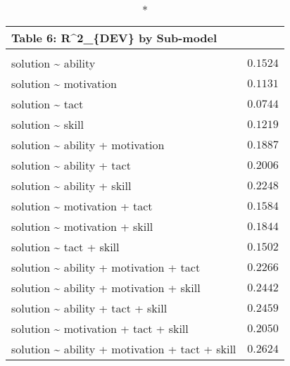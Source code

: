 \begin{longtable}{lr}
\caption*{
{\large Table 6: R\textasciicircum{}2\_\{DEV\} by Sub-model}
} \\ 
\toprule
 &  \\ 
\midrule\addlinespace[2.5pt]
solution \textasciitilde{} ability & $0.1524$ \\ 
solution \textasciitilde{} motivation & $0.1131$ \\ 
solution \textasciitilde{} tact & $0.0744$ \\ 
solution \textasciitilde{} skill & $0.1219$ \\ 
solution \textasciitilde{} ability + motivation & $0.1887$ \\ 
solution \textasciitilde{} ability + tact & $0.2006$ \\ 
solution \textasciitilde{} ability + skill & $0.2248$ \\ 
solution \textasciitilde{} motivation + tact & $0.1584$ \\ 
solution \textasciitilde{} motivation + skill & $0.1844$ \\ 
solution \textasciitilde{} tact + skill & $0.1502$ \\ 
solution \textasciitilde{} ability + motivation + tact & $0.2266$ \\ 
solution \textasciitilde{} ability + motivation + skill & $0.2442$ \\ 
solution \textasciitilde{} ability + tact + skill & $0.2459$ \\ 
solution \textasciitilde{} motivation + tact + skill & $0.2050$ \\ 
solution \textasciitilde{} ability + motivation + tact + skill & $0.2624$ \\ 
\bottomrule
\end{longtable}

